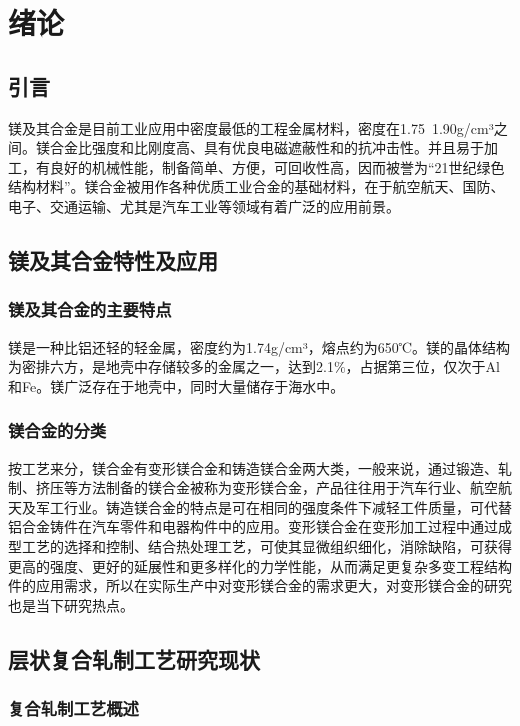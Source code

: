\section{绪论}
\subsection{引言}

镁及其合金是目前工业应用中密度最低的工程金属材料，密度在1.75~1.90g/cm³之间。镁合金比强度和比刚度高、具有优良电磁遮蔽性和的抗冲击性。并且易于加工，有良好的机械性能，制备简单、方便，可回收性高，因而被誉为“21世纪绿色结构材料”\cite{a1,i2}。镁合金被用作各种优质工业合金的基础材料，在于航空航天、国防、电子、交通运输、尤其是汽车工业等领域有着广泛的应用前景\cite{a1,a3,i4}。\par

\subsection{镁及其合金特性及应用}
\subsubsection{镁及其合金的主要特点}

镁是一种比铝还轻的轻金属，密度约为1.74g/cm³，熔点约为650℃。镁的晶体结构为密排六方，是地壳中存储较多的金属之一，达到2.1$\%$，占据第三位，仅次于Al和Fe。镁广泛存在于地壳中，同时大量储存于海水中。\par

\subsubsection{镁合金的分类}

按工艺来分，镁合金有变形镁合金和铸造镁合金两大类，一般来说，通过锻造、轧制、挤压等方法制备的镁合金被称为变形镁合金，产品往往用于汽车行业、航空航天及军工行业。铸造镁合金的特点是可在相同的强度条件下减轻工件质量，可代替铝合金铸件在汽车零件和电器构件中的应用。变形镁合金在变形加工过程中通过成型工艺的选择和控制、结合热处理工艺，可使其显微组织细化，消除缺陷，可获得更高的强度、更好的延展性和更多样化的力学性能，从而满足更复杂多变工程结构件的应用需求，所以在实际生产中对变形镁合金的需求更大，对变形镁合金的研究也是当下研究热点。\par

\subsection{层状复合轧制工艺研究现状}
\subsubsection{复合轧制工艺概述}

